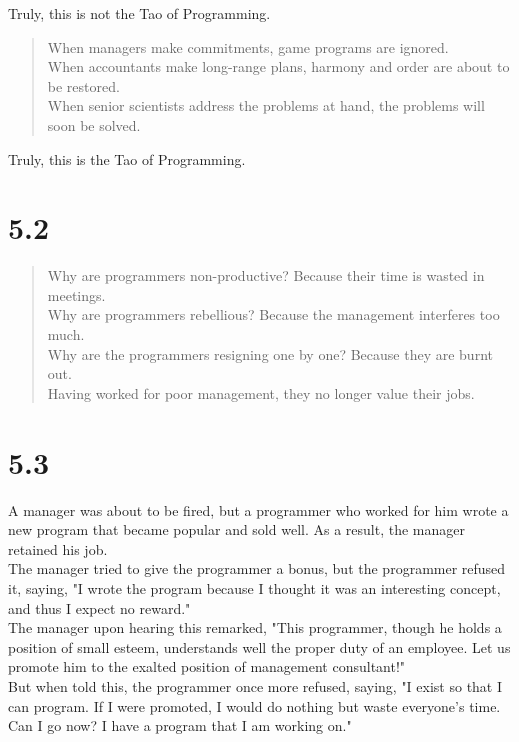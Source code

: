 \documentclass[14pt, letterpaper]{book}
\begin{document}
Truly, this is not the Tao of Programming.\\
\begin{verse}
When managers make commitments, game programs are ignored. \\
When accountants make long-range plans, harmony and order are about to be restored. \\
When senior scientists address the problems at hand, the problems will soon be solved.\\
\end{verse}

Truly, this is the Tao of Programming.

\section*{5.2}

\begin{verse}
    Why are programmers non-productive? Because their time is wasted in meetings. \\
    Why are programmers rebellious? Because the management interferes too much. \\
    Why are the programmers resigning one by one? Because they are burnt out. \\
    Having worked for poor management, they no longer value their jobs.\\
\end{verse}

\section*{5.3}
A manager was about to be fired, but a programmer who worked for him wrote a new program that became popular and sold well. As a result, the manager retained his job.\\

The manager tried to give the programmer a bonus, but the programmer refused it, saying, "I wrote the program because I thought it was an interesting concept, and thus I expect no reward."\\

The manager upon hearing this remarked, "This programmer, though he holds a position of small esteem, understands well the proper duty of an employee. Let us promote him to the exalted position of management consultant!"\\

But when told this, the programmer once more refused, saying, "I exist so that I can program. If I were promoted, I would do nothing but waste everyone's time. Can I go now? I have a program that I am working on."
\end{document}
